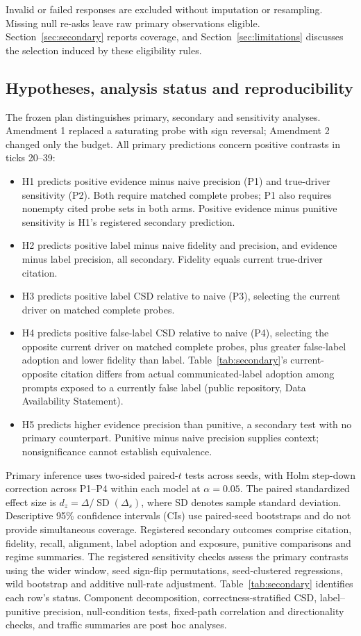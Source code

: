 \documentclass[futureinternet,article,submit,moreauthors,pdftex]{Definitions/mdpi}
\begin{document}
Invalid or failed responses are excluded without imputation or resampling. Missing null re-asks leave raw primary observations eligible. Section~\ref{sec:secondary} reports coverage, and Section~\ref{sec:limitations} discusses the selection induced by these eligibility rules.

\subsection{Hypotheses, analysis status and reproducibility}\label{sec:analysis}
The frozen plan distinguishes primary, secondary and sensitivity analyses. Amendment 1 replaced a saturating probe with sign reversal; Amendment 2 changed only the budget. All primary predictions concern positive contrasts in ticks 20--39:
\begin{itemize}\setlength{\itemsep}{0pt}
\item H1 predicts positive evidence minus naive precision (P1) and true-driver sensitivity (P2). Both require matched complete probes; P1 also requires nonempty cited probe sets in both arms. Positive evidence minus punitive sensitivity is H1's registered secondary prediction.
\item H2 predicts positive label minus naive fidelity and precision, and evidence minus label precision, all secondary. Fidelity equals current true-driver citation.
\item H3 predicts positive label CSD relative to naive (P3), selecting the current driver on matched complete probes.
\item H4 predicts positive false-label CSD relative to naive (P4), selecting the opposite current driver on matched complete probes, plus greater false-label adoption and lower fidelity than label. Table~\ref{tab:secondary}'s current-opposite citation differs from actual communicated-label adoption among prompts exposed to a currently false label (public repository, Data Availability Statement).
\item H5 predicts higher evidence precision than punitive, a secondary test with no primary counterpart. Punitive minus naive precision supplies context; nonsignificance cannot establish equivalence.
\end{itemize}

Primary inference uses two-sided paired-$t$ tests across seeds, with Holm step-down correction across P1--P4 within each model at $\alpha=0.05$. The paired standardized effect size is $d_z=\Delta/\operatorname{SD}(\Delta_s)$, where SD denotes sample standard deviation. Descriptive 95\% confidence intervals (CIs) use paired-seed bootstraps and do not provide simultaneous coverage. Registered secondary outcomes comprise citation, fidelity, recall, alignment, label adoption and exposure, punitive comparisons and regime summaries. The registered sensitivity checks assess the primary contrasts using the wider window, seed sign-flip permutations, seed-clustered regressions, wild bootstrap and additive null-rate adjustment. Table~\ref{tab:secondary} identifies each row's status. Component decomposition, correctness-stratified CSD, label--punitive precision, null-condition tests, fixed-path correlation and directionality checks, and traffic summaries are post hoc analyses.
\end{document}
